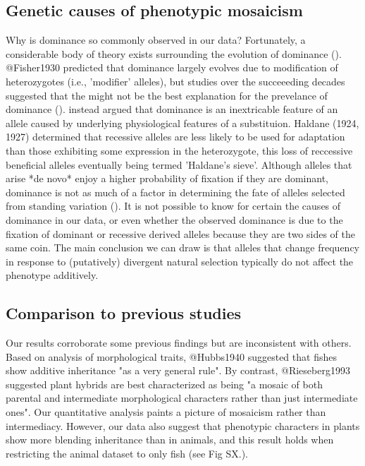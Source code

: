 \documentclass[times, twoside, watermark]{zHenriquesLab-StyleBioRxiv}
\begin{document}
\subsection*{Genetic causes of phenotypic mosaicism}
Why is dominance so commonly observed in our data? Fortunately, a considerable body of theory exists surrounding the evolution of dominance (\citealt{Keightley1996}). @Fisher1930 predicted that dominance largely evolves due to modification of heterozygotes (i.e., 'modifier' alleles), but studies over the succeeeding decades suggested that the might not be the best explanation for the prevelance of dominance (\citealt{Charlesworth1998}). \cite{Wright1934} instead argued that dominance is an inextricable feature of an allele caused by underlying physiological features of a substituion. Haldane (1924, 1927) determined that recessive alleles are less likely to be used for adaptation than those exhibiting some expression in the heterozygote, this loss of reccessive beneficial alleles eventually being termed 'Haldane's sieve'. Although alleles that arise *de novo* enjoy a higher probability of fixation if they are dominant, dominance is not as much of a factor in determining the fate of alleles selected from standing variation (\citealt{Orr2001; @Hermisson2005}). It is not possible to know for certain the causes of dominance in our data, or even whether the observed dominance is due to the fixation of dominant or recessive derived alleles because they are two sides of the same coin. The main conclusion we can draw is that alleles that change frequency in response to (putatively) divergent natural selection typically do not affect the phenotype additively.\par

\subsection*{Comparison to previous studies}

Our results corroborate some previous findings but are inconsistent with others. Based on analysis of morphological traits, @Hubbs1940 suggested that fishes show additive inheritance "as a very general rule". By contrast,  @Rieseberg1993 suggested plant hybrids are best characterized as being "a mosaic of both parental and intermediate morphological characters rather than just intermediate ones". Our quantitative analysis paints a picture of mosaicism rather than intermediacy. However, our data also suggest that phenotypic characters in plants show more blending inheritance than in animals, and this result holds when restricting the animal dataset to only fish (see Fig SX.).\par
\end{document}
